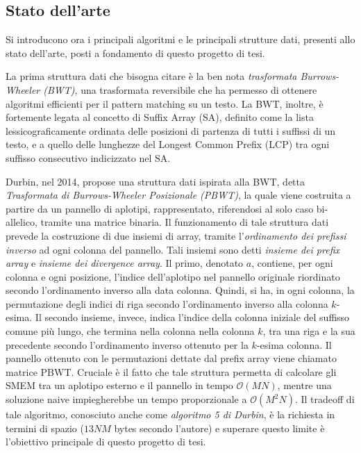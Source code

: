 \documentclass[a4paper,11pt, oneside,italian]{article}
\begin{document}
\subsection*{Stato dell'arte}
Si introducono ora i principali algoritmi e le principali strutture dati,
presenti allo stato dell'arte, posti a fondamento di questo progetto di tesi.

La prima struttura dati che bisogna citare è la  ben nota \textit{trasformata
  Burrows-Wheeler (BWT)}, una trasformata reversibile che ha permesso di
ottenere algoritmi efficienti per il pattern matching su un testo.
La BWT, inoltre, è fortemente legata al concetto di Suffix Array (SA), definito
come la lista lessicograficamente ordinata delle posizioni di partenza di 
tutti i suffissi di un testo, e a quello delle lunghezze del Longest Common
Prefix (LCP) tra ogni suffisso consecutivo indicizzato nel SA.

Durbin, nel 2014, propose una struttura dati ispirata alla BWT, detta
\textit{Trasformata di Burrows-Wheeler Posizionale (PBWT)}, la quale viene
costruita a partire da un pannello di aplotipi, rappresentato, riferendosi al
solo caso bi-allelico, tramite una matrice binaria. Il funzionamento di tale
struttura dati prevede la costruzione di due insiemi di array, tramite
l'\textit{ordinamento dei prefissi inverso} ad ogni colonna del pannello.
Tali insiemi sono detti \textit{insieme dei prefix array} e \textit{insieme dei
  divergence array}. Il primo, denotato $a$, contiene, per ogni colonna e ogni
posizione, l'indice dell'aplotipo nel pannello originale riordinato secondo
l'ordinamento inverso alla data colonna. Quindi, si ha, in ogni colonna, la
permutazione degli indici di riga secondo l'ordinamento inverso alla colonna
$k$-esima. 
Il secondo insieme, invece, indica l'indice della colonna iniziale del suffisso
comune più lungo, che termina nella colonna nella colonna $k$, tra una riga e la
sua precedente secondo l'ordinamento inverso ottenuto per la $k$-esima colonna.
Il pannello ottenuto con le permutazioni dettate dal prefix array viene chiamato
matrice PBWT.
Cruciale è il fatto che tale struttura permetta di calcolare gli SMEM tra
un aplotipo esterno e il pannello in tempo $\mathcal{O}(MN)$, mentre 
una soluzione naive impiegherebbe un tempo proporzionale a
$\mathcal{O}(M^2N)$. Il tradeoff di tale algoritmo, conosciuto anche come
\textit{algoritmo 5 di Durbin}, è la richiesta in termini di spazio ($13NM$
bytes secondo l'autore) e superare questo limite è l'obiettivo principale di
questo progetto di tesi. 
\end{document}

